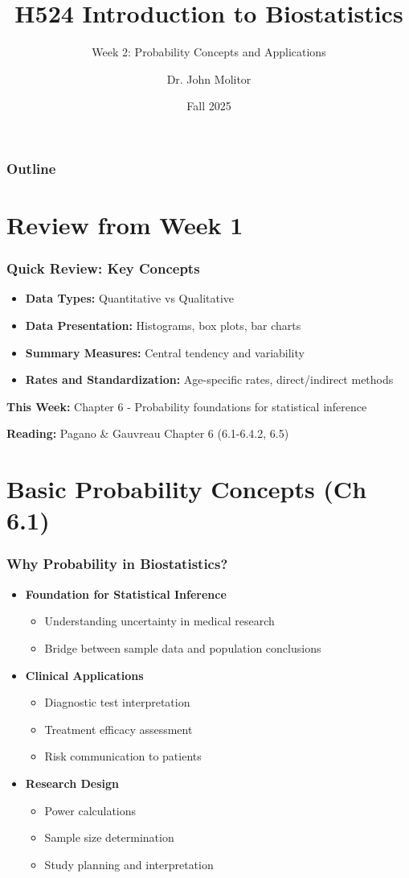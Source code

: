\documentclass{beamer}
\title{H524 Introduction to Biostatistics}
\subtitle{Week 2: Probability Concepts and Applications}
\author{Dr. John Molitor}
\institute{}
\date{Fall 2025}
\begin{document}
\frame{\titlepage}

\begin{frame}
\frametitle{Outline}
\tableofcontents
\end{frame}

\section{Review from Week 1}

\begin{frame}
\frametitle{Quick Review: Key Concepts}
\begin{itemize}
\item \textbf{Data Types:} Quantitative vs Qualitative
\item \textbf{Data Presentation:} Histograms, box plots, bar charts
\item \textbf{Summary Measures:} Central tendency and variability
\item \textbf{Rates and Standardization:} Age-specific rates, direct/indirect methods
\end{itemize}

\vspace{0.5cm}
\textbf{This Week:} Chapter 6 - Probability foundations for statistical inference

\vspace{0.3cm}
\textbf{Reading:} Pagano \& Gauvreau Chapter 6 (6.1-6.4.2, 6.5)
\end{frame}

\section{Basic Probability Concepts (Ch 6.1)}

\begin{frame}
\frametitle{Why Probability in Biostatistics?}
\begin{itemize}
\item \textbf{Foundation for Statistical Inference}
  \begin{itemize}
  \item Understanding uncertainty in medical research
  \item Bridge between sample data and population conclusions
  \end{itemize}
\item \textbf{Clinical Applications}
  \begin{itemize}
  \item Diagnostic test interpretation
  \item Treatment efficacy assessment
  \item Risk communication to patients
  \end{itemize}
\item \textbf{Research Design}
  \begin{itemize}
  \item Power calculations
  \item Sample size determination
  \item Study planning and interpretation
  \end{itemize}
\end{itemize}
\end{frame}
\end{document}
